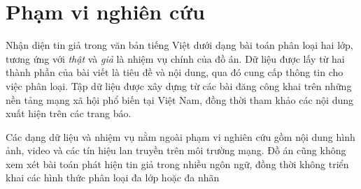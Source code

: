 \section{Phạm vi nghiên cứu}

Nhận diện tin giả trong văn bản tiếng Việt dưới dạng bài toán phân loại hai lớp, tương ứng với \textit{thật} và \textit{giả} là nhiệm vụ chính của đồ án. Dữ liệu được lấy từ hai thành phần của bài viết là tiêu đề và nội dung, qua đó cung cấp thông tin cho việc phân loại. Tập dữ liệu được xây dựng từ các bài đăng công khai trên những nền tảng mạng xã hội phổ biến tại Việt Nam, đồng thời tham khảo các nội dung xuất hiện trên các trang báo.

Các dạng dữ liệu và nhiệm vụ nằm ngoài phạm vi nghiên cứu gồm nội dung hình ảnh, video và các tín hiệu lan truyền trên môi trường mạng. Đồ án cũng không xem xét bài toán phát hiện tin giả trong nhiều ngôn ngữ, đồng thời không triển khai các hình thức phân loại đa lớp hoặc đa nhãn